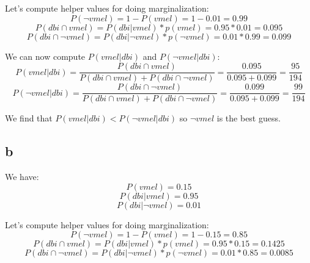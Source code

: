 \documentclass[10pt]{article}
\begin{document}
Let's compute helper values for doing marginalization:
\begin{equation*}
    P(\neg vmel) = 1 - P(vmel) = 1 - 0.01 = 0.99
\end{equation*}
\begin{equation*}
    P(dbi \cap vmel) = P(dbi|vmel) * p(vmel) = 0.95 * 0.01 = 0.095
\end{equation*}
\begin{equation*}
    P(dbi \cap \neg vmel) = P(dbi|\neg vmel) * p(\neg vmel) = 0.01 * 0.99 = 0.099
\end{equation*}


We can now compute $P(vmel|dbi)$ and $P(\neg vmel|dbi)$:
\begin{equation*}
    P(vmel|dbi) = \frac{P(dbi \cap vmel)}{P(dbi \cap vmel) + P(dbi \cap \neg vmel)}
    = \frac{0.095}{0.095 + 0.099} = \frac{95}{194}
\end{equation*}
\begin{equation*}
    P(\neg vmel|dbi) = \frac{P(dbi \cap \neg vmel)}{P(dbi \cap vmel) + P(dbi \cap \neg vmel)}
    = \frac{0.099}{0.095 + 0.099} = \frac{99}{194}
\end{equation*}


We find that $P(vmel|dbi) < P(\neg vmel|dbi)$ so $\neg vmel$ is the
best guess.


\subsection*{b}
We have:
\begin{equation*}
    P(vmel) = 0.15
\end{equation*}
\begin{equation*}
    P(dbi|vmel) = 0.95
\end{equation*}
\begin{equation*}
    P(dbi|\neg vmel) = 0.01
\end{equation*}

Let's compute helper values for doing marginalization:
\begin{equation*}
    P(\neg vmel) = 1 - P(vmel) = 1 - 0.15 = 0.85
\end{equation*}
\begin{equation*}
    P(dbi \cap vmel) = P(dbi|vmel) * p(vmel) = 0.95 * 0.15 = 0.1425
\end{equation*}
\begin{equation*}
    P(dbi \cap \neg vmel) = P(dbi|\neg vmel) * p(\neg vmel) = 0.01 * 0.85 = 0.0085
\end{equation*}
\end{document}

